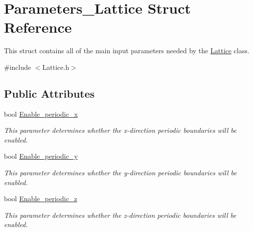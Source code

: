 \hypertarget{struct_parameters___lattice}{}\section{Parameters\+\_\+\+Lattice Struct Reference}
\label{struct_parameters___lattice}


This struct contains all of the main input parameters needed by the \hyperlink{class_lattice}{Lattice} class.  




{\ttfamily \#include $<$Lattice.\+h$>$}

\subsection*{Public Attributes}
\begin{DoxyCompactItemize}
\item 
\mbox{\label{struct_parameters___lattice_a922f7e39f7debc0bd06ec1f0f1ca8257}} 
bool \hyperlink{struct_parameters___lattice_a922f7e39f7debc0bd06ec1f0f1ca8257}{Enable\+\_\+periodic\+\_\+x}
\begin{DoxyCompactList}\small\item\em This parameter determines whether the x-\/direction periodic boundaries will be enabled. \end{DoxyCompactList}\item 
\mbox{\label{struct_parameters___lattice_a9ee9c54330f7cd0bc32fd80e27ee87ff}} 
bool \hyperlink{struct_parameters___lattice_a9ee9c54330f7cd0bc32fd80e27ee87ff}{Enable\+\_\+periodic\+\_\+y}
\begin{DoxyCompactList}\small\item\em This parameter determines whether the y-\/direction periodic boundaries will be enabled. \end{DoxyCompactList}\item 
\mbox{\label{struct_parameters___lattice_aff375c434a37560067d9cc677cff8052}} 
bool \hyperlink{struct_parameters___lattice_aff375c434a37560067d9cc677cff8052}{Enable\+\_\+periodic\+\_\+z}
\begin{DoxyCompactList}\small\item\em This parameter determines whether the z-\/direction periodic boundaries will be enabled. \end{DoxyCompactList}\item 

\end{DoxyCompactItemize}
